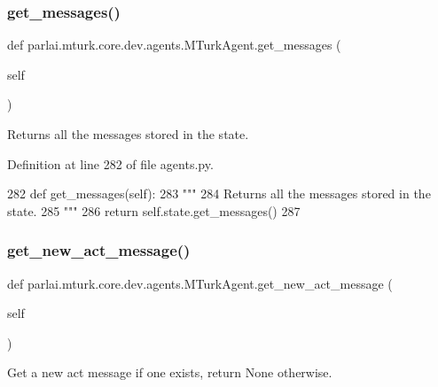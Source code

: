 \subsubsection{\texorpdfstring{get\+\_\+messages()}{get\_messages()}}
{\footnotesize\ttfamily def parlai.\+mturk.\+core.\+dev.\+agents.\+M\+Turk\+Agent.\+get\+\_\+messages (\begin{DoxyParamCaption}\item[{}]{self }\end{DoxyParamCaption})}

\begin{DoxyVerb}Returns all the messages stored in the state.
\end{DoxyVerb}
 

Definition at line 282 of file agents.\+py.


\begin{DoxyCode}
282     \textcolor{keyword}{def }get\_messages(self):
283         \textcolor{stringliteral}{"""}
284 \textcolor{stringliteral}{        Returns all the messages stored in the state.}
285 \textcolor{stringliteral}{        """}
286         \textcolor{keywordflow}{return} self.state.get\_messages()
287 
\end{DoxyCode}
\mbox{\label{classparlai_1_1mturk_1_1core_1_1dev_1_1agents_1_1MTurkAgent_aab8cc8a2bb337300bd39709702e68cff}} 
\subsubsection{\texorpdfstring{get\+\_\+new\+\_\+act\+\_\+message()}{get\_new\_act\_message()}}
{\footnotesize\ttfamily def parlai.\+mturk.\+core.\+dev.\+agents.\+M\+Turk\+Agent.\+get\+\_\+new\+\_\+act\+\_\+message (\begin{DoxyParamCaption}\item[{}]{self }\end{DoxyParamCaption})}

\begin{DoxyVerb}Get a new act message if one exists, return None otherwise.
\end{DoxyVerb}
 

